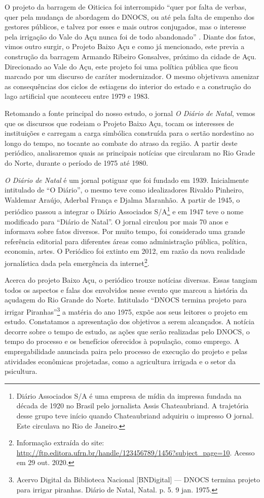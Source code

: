 \begin{refsection}
    O projeto da barragem de Oiticica foi interrompido ``quer por falta de verbas, quer pela mudança de abordagem do DNOCS, ou até pela falta de empenho dos gestores públicos, e talvez por esses e mais outros conjugados, mas o interesse pela irrigação do Vale do Açu nunca foi de todo abandonado'' \cite[p.~130]{Pinheiro2018Vale}. Diante dos fatos, vimos outro surgir, o Projeto Baixo Açu e como já mencionado, este previa a construção da barragem Armando Ribeiro Gonsalves, próximo da cidade de Açu. Direcionado ao Vale do Açu, este projeto foi uma política pública que ficou marcado por um discurso de caráter modernizador. O mesmo objetivava amenizar as consequências dos ciclos de estiagens do interior do estado e a construção do lago artificial que aconteceu entre 1979 e 1983.  

    Retomando a fonte principal do nosso estudo, o jornal \textit{O Diário de Natal}, vemos que os discursos que rodeiam o Projeto Baixo Açu, tocam os interesses de instituições e carregam a carga simbólica construída para o sertão nordestino ao longo do tempo, no tocante ao combate do atraso da região. A partir deste periódico, analisaremos quais as principais notícias que circularam no Rio Grade do Norte, durante o período de 1975 até 1980.

    \textit{O Diário de Natal} é um jornal potiguar que foi fundado em 1939. Inicialmente intitulado de ``O Diário'', o mesmo teve como idealizadores Rivaldo Pinheiro, Waldemar Araújo, Aderbal França e Djalma Maranhão. A partir de 1945, o periódico passou a integrar o Diário Associados S/A\footnote{Diário Associados S/A é uma empresa de mídia da impressa fundada na década de 1920 no Brasil pelo jornalista Assis Chateaubriand. A trajetória desse grupo teve início quando Chateaubriand adquiriu o impresso O jornal. Este circulava no Rio de Janeiro.} e em 1947 teve o nome modificado para ``Diário de Natal''.  O jornal circulou por mais 70 anos e informava sobre fatos diversos. Por muito tempo, foi considerado uma grande referência editorial para diferentes áreas como administração pública, política, economia, artes. O Periódico foi extinto em 2012, em razão da nova realidade jornalística dada pela emergência da internet\footnote{Informação extraída do site: \url{http://ftp.editora.ufrn.br/handle/123456789/1456?subject_page=10}. Acesso em 29 out. 2020.}.

    Acerca do projeto Baixo Açu, o periódico trouxe notícias diversas. Essas tangiam todos os aspectos e falas dos envolvidos nesse evento que marcou a história da açudagem do Rio Grande do Norte. Intitulado ``DNOCS termina projeto para irrigar Piranhas''\footnote{Acervo Digital da Biblioteca Nacional [BNDigital] --- DNOCS termina projeto para irrigar piranhas. Diário de Natal, Natal. p. 5. 9 jan. 1975.} a matéria do ano 1975, expõe aos seus leitores o projeto em estudo. Constatamos a apresentação dos objetivos a serem alcançados. A notícia decorre sobre o tempo de estudo, as ações que serão realizadas pelo DNOCS, o tempo do processo e os benefícios oferecidos à população, como emprego. A empregabilidade anunciada paira pelo processo de execução do projeto e pelas atividades econômicas projetadas, como a agricultura irrigada e o setor da psicultura. 


\end{refsection}

